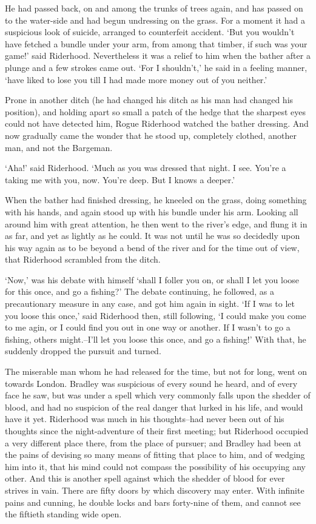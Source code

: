 He had passed back, on and among the trunks of trees again, and has
passed on to the water-side and had begun undressing on the grass. For
a moment it had a suspicious look of suicide, arranged to counterfeit
accident. ‘But you wouldn’t have fetched a bundle under your arm, from
among that timber, if such was your game!’ said Riderhood. Nevertheless
it was a relief to him when the bather after a plunge and a few strokes
came out. ‘For I shouldn’t,’ he said in a feeling manner, ‘have liked to
lose you till I had made more money out of you neither.’

Prone in another ditch (he had changed his ditch as his man had changed
his position), and holding apart so small a patch of the hedge that the
sharpest eyes could not have detected him, Rogue Riderhood watched the
bather dressing. And now gradually came the wonder that he stood up,
completely clothed, another man, and not the Bargeman.

‘Aha!’ said Riderhood. ‘Much as you was dressed that night. I see.
You’re a taking me with you, now. You’re deep. But I knows a deeper.’

When the bather had finished dressing, he kneeled on the grass, doing
something with his hands, and again stood up with his bundle under his
arm. Looking all around him with great attention, he then went to the
river’s edge, and flung it in as far, and yet as lightly as he could. It
was not until he was so decidedly upon his way again as to be beyond a
bend of the river and for the time out of view, that Riderhood scrambled
from the ditch.

‘Now,’ was his debate with himself ‘shall I foller you on, or shall I
let you loose for this once, and go a fishing?’ The debate continuing,
he followed, as a precautionary measure in any case, and got him again
in sight. ‘If I was to let you loose this once,’ said Riderhood then,
still following, ‘I could make you come to me agin, or I could find
you out in one way or another. If I wasn’t to go a fishing, others
might.--I’ll let you loose this once, and go a fishing!’ With that, he
suddenly dropped the pursuit and turned.

The miserable man whom he had released for the time, but not for long,
went on towards London. Bradley was suspicious of every sound he heard,
and of every face he saw, but was under a spell which very commonly
falls upon the shedder of blood, and had no suspicion of the real danger
that lurked in his life, and would have it yet. Riderhood was much
in his thoughts--had never been out of his thoughts since the
night-adventure of their first meeting; but Riderhood occupied a very
different place there, from the place of pursuer; and Bradley had been
at the pains of devising so many means of fitting that place to him, and
of wedging him into it, that his mind could not compass the possibility
of his occupying any other. And this is another spell against which
the shedder of blood for ever strives in vain. There are fifty doors by
which discovery may enter. With infinite pains and cunning, he double
locks and bars forty-nine of them, and cannot see the fiftieth standing
wide open.

